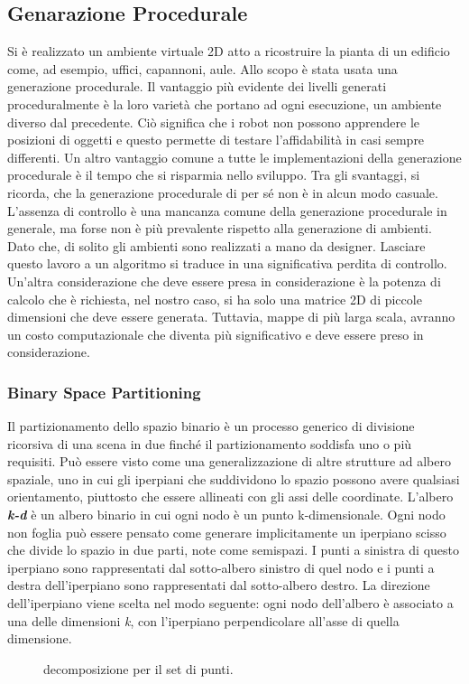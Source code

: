 \subsection{Genarazione Procedurale}
\label{ssec:generazioneproc}
Si è realizzato un ambiente virtuale 2D atto a ricostruire
la pianta di un edificio come, ad esempio, uffici, capannoni, aule. Allo scopo
è stata usata una generazione procedurale.
Il vantaggio più evidente dei livelli generati proceduralmente è la loro varietà
che portano ad ogni esecuzione, un ambiente diverso dal precedente.
Ciò significa che i robot non possono apprendere le posizioni di oggetti e
questo permette di testare l'affidabilità in casi sempre differenti.
Un altro vantaggio comune a tutte le implementazioni della generazione
procedurale è il tempo che si risparmia nello sviluppo.
Tra gli svantaggi, si ricorda, che la generazione procedurale di per sé non è
in alcun modo casuale.
L'assenza di controllo è una mancanza comune della generazione procedurale in
generale, ma forse non è più prevalente rispetto alla generazione di ambienti.
Dato che, di solito gli ambienti sono realizzati a mano da designer.
Lasciare questo lavoro a un algoritmo si traduce in una significativa perdita di
controllo.
Un'altra considerazione che deve essere presa in considerazione è la potenza di
calcolo che è richiesta, nel nostro caso, si ha solo una matrice 2D di piccole
dimensioni che deve essere generata. Tuttavia, mappe di più larga scala, avranno
un costo computazionale che diventa più significativo e deve essere preso in
considerazione.\cite{green2016procedural}

\subsubsection{Binary Space Partitioning}
\label{sssec:binaryspace}
Il partizionamento dello spazio binario è un processo generico di divisione
ricorsiva di una scena in due finché il partizionamento soddisfa uno o più
requisiti.
Può essere visto come una generalizzazione di altre strutture ad albero spaziale,
uno in cui gli iperpiani che suddividono lo spazio possono avere qualsiasi
orientamento, piuttosto che essere allineati con gli assi delle coordinate.\cite{wiki:bsp}
L'albero \textbf{\emph{k-d}} è un albero binario in cui ogni nodo è un punto
k-dimensionale. Ogni nodo non foglia può essere pensato come generare
implicitamente un iperpiano scisso che divide lo spazio in due parti, note come
semispazi. I punti a sinistra di questo iperpiano sono rappresentati dal
sotto-albero sinistro di quel nodo e i punti a destra dell'iperpiano sono
rappresentati dal sotto-albero destro. La direzione dell'iperpiano viene scelta
nel modo seguente: ogni nodo dell'albero è associato a una delle dimensioni \emph{k},
con l'iperpiano perpendicolare all'asse di quella dimensione.\cite{wiki:kdtree}

\begin{figure}[!htb]
\centering
    \resizebox{0.7\linewidth}{!}{}
\caption{decomposizione per il set di punti.}
\label{fig:decomposizione}
\end{figure}
